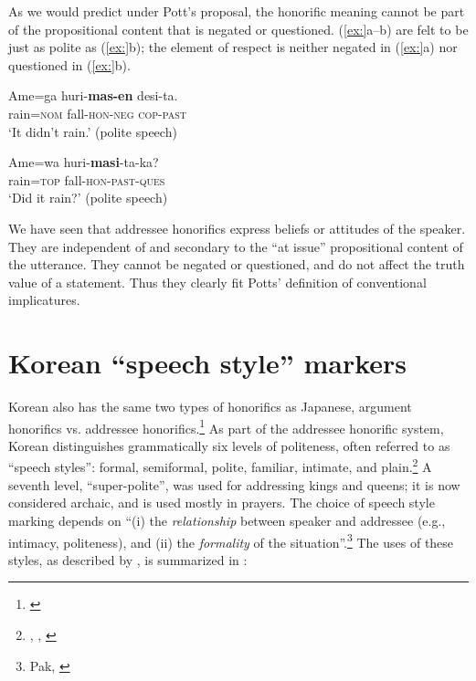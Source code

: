 As we would predict under Pott’s proposal, the honorific meaning cannot be part of the propositional content that is negated or questioned. (\ref{ex:}a--b) are felt to be just as polite as (\ref{ex:}b); the element of respect is neither negated in (\ref{ex:}a) nor questioned in (\ref{ex:}b).


\ea
\ea \gll Ame=ga  huri-\textbf{mas-en}  desi-ta.\\
rain=\textsc{nom}  fall-\textsc{hon-neg  cop-past}\\
\glt ‘It didn’t rain.’  (polite speech)

\ex
 \gll  Ame=wa  huri-\textbf{masi}-ta-ka?\\
rain=\textsc{top}  fall-\textsc{hon-past-ques}\\
\glt ‘Did it rain?’  (polite speech)
\z \z


We have seen that addressee honorifics express beliefs or attitudes of the speaker. They are independent of and secondary to the “at issue” propositional content of the utterance. They cannot be negated or questioned, and do not affect the truth value of a statement. Thus they clearly fit Potts’ definition of conventional implicatures.


\section{Korean “speech style” markers}\label{sec:}  %

Korean also has the same two types of honorifics as Japanese, argument honorifics vs. addressee honorifics.\footnote{\citet{KimSells2007}} As part of the addressee honorific system, Korean distinguishes grammatically six levels of politeness, often referred to as “speech styles”: formal, semiformal, polite, familiar, intimate, and plain.\footnote{\citet{Martin1992}, \citet{Pak2008}, \citet{Sohn1999}} A seventh level, “super-polite”, was used for addressing kings and queens; it is now considered archaic, and is used mostly in prayers. The choice of speech style marking depends on “(i) the \textit{relationship} between speaker and addressee (e.g., intimacy, politeness), and (ii) the \textit{formality} of the situation”.\footnote{Pak, \citet{PortnerZanuttini2013}} The uses of these styles, as described by \citet[120]{Pak2008}, is summarized in :

